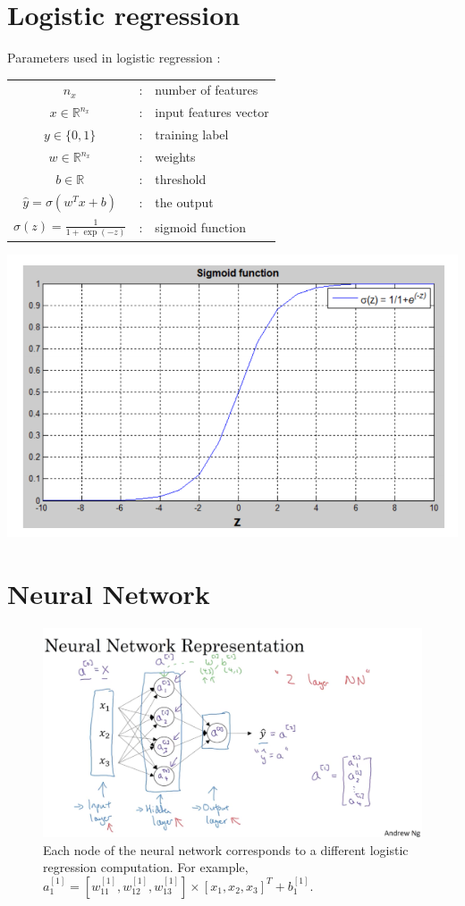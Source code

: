 \documentclass[letter]{article}
\begin{document}
	\section{Logistic regression}
	
	Parameters used in logistic regression :
	\vspace{0.5cm}
	 
	\begin{tabular}{ccl}
		$n_x$ & : &  number of features \\
		$x\in\mathbb{R}^{n_x}$ & : & input features vector \\
		$y\in\{0,1\}$ & : & training label \\
		$w\in\mathbb{R}^{n_x}$ & : & weights \\
		$b\in\mathbb{R}$ & : & threshold \\
		$\hat{y} = \sigma(w^T x + b)$ & : & the output \\
		$\sigma(z) = \frac{1}{1+\exp(-z)}$ & : & sigmoid function
	\end{tabular}

	\includegraphics[scale=0.7]{sigmoid_function.png}
	
	
	\section{Neural Network}
	\begin{figure}
		\includegraphics[scale=0.3]{neural_network_representation.png}
		\caption{
			Each node of the neural network corresponds to a different logistic regression computation.
			For example, $a_1^{[1]} = [w_{11}^{[1]}, w_{12}^{[1]}, w_{13}^{[1]}] \times [x_1, x_2, x_3]^T + b_1^{[1]}$.
		}
	\end{figure}
	
	
	
	
	
	
\end{document}
